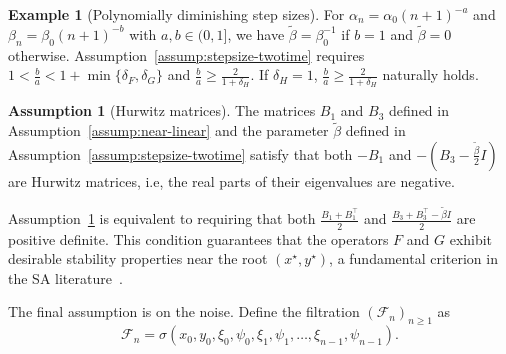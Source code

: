 \documentclass[11pt]{article}
\theoremstyle{plain}
\theoremstyle{definition}
\newtheorem{assump}{Assumption}[section]
\newtheorem{exam}{Example}[section]
\def\Hsmooth{{\delta_H}}
\def\Fsmooth{{\delta_F}}
\def\Gsmooth{{\delta_G}}
\def\invdiffslow{\tilde{\beta}}
\def\mI{{\bm{I}}}
\def\FM{{\mathcal F}}
\def\mI{{I}}
\begin{document}
\begin{exam}[Polynomially diminishing step sizes]\label{exmp:fclt-stepsize}
	For 
	$\alpha_{n} = \alpha_{0} (n+1)^{-a}$ and $\beta_{n} = \beta_{0} (n+1)^{-b}$ with $a, b \in (0, 1]$, 
	we have $\invdiffslow = \beta_{0}^{-1}$ if $b = 1$ and $\invdiffslow = 0$ otherwise.
	Assumption~\ref{assump:stepsize-twotime} requires $1 < \frac{b}{a} < 1 + \min\{ \Fsmooth, \Gsmooth \} $ and $\frac{b}{a} \ge \frac{2}{1+\Hsmooth} $. 
	If $\Hsmooth=1$,  $\frac{b}{a} \ge \frac{2}{1+\Hsmooth} $ naturally holds.
\end{exam}



\begin{assump}[Hurwitz matrices]\label{assump:hurwitz}
	The matrices $B_1$ and $B_3$ defined in Assumption~\ref{assump:near-linear} and the parameter $\invdiffslow$ defined in Assumption~\ref{assump:stepsize-twotime} satisfy that both $- B_1 $ and $- \left( B_3 - \frac{\invdiffslow}{2} \mI \right)$ are Hurwitz matrices, i.e, the real parts of their eigenvalues are negative.
\end{assump}

Assumption~\ref{assump:hurwitz} is equivalent to requiring that both $\frac{B_1 + B_1^\top}{2}$ and $\frac{ B_3 + B_3^\top - \invdiffslow \mI }{2}$ are positive definite.
This condition guarantees that the operators $F$ and $G$ exhibit desirable stability properties near the root $(x^\star, y^\star)$, a fundamental criterion in the SA literature~\citep{polyak1992acceleration, konda2004convergence, mokkadem2006convergence, li2023online}.

The final assumption is on the noise.
Define the filtration $( \FM_{n} )_{n \ge 1}$ as 
\begin{equation*}
	\FM_{n} = \sigma ( x_{0},y_{0},\xi_{0},\psi_{0},\xi_{1},\psi_{1},\ldots,\xi_{n-1},\psi_{n-1} ).
\end{equation*}
\end{document}
